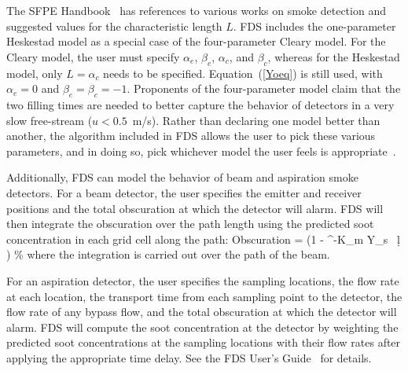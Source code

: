 The SFPE Handbook~\cite{SFPE} has references to various works on smoke detection and suggested values for the
characteristic length $L$. FDS includes the one-parameter Heskestad model as a special case of the four-parameter
Cleary model. For the Cleary model, the user must specify
$\alpha_e$, $\beta_e$, $\alpha_c$, and $\beta_c$, whereas for the Heskestad model, only $L=\alpha_c$ needs to be
specified. Equation~(\ref{Yoeq})
is still used, with $\alpha_e=0$ and $\beta_e=\beta_c=-1$.
Proponents of the four-parameter model claim that the two filling times are needed to
better capture the behavior of detectors in a very
slow free-stream ($u<0.5$~m/s). Rather than declaring one model better than another,
the algorithm included in FDS allows the
user to pick these various parameters, and in doing so, pick whichever model the user feels is appropriate~\cite{CSE_GCR}.

Additionally, FDS can model the behavior of beam and aspiration smoke detectors.  For a beam detector, the user
specifies the emitter and receiver positions and the total obscuration at which the detector will alarm.  FDS will then
integrate the obscuration over the path length using the predicted soot concentration in each grid cell along
the path:  
\be
  \hbox{Obscuration}  = \left(1 - ^{-K_m \int \rho Y_s \, \d l }  \right)   \; \; \hbox{\%}
\ee
where the integration is carried out over the path of the beam.

For an aspiration detector, the user specifies the sampling locations, the flow rate at each location, the
transport time from each sampling point to the detector, the flow rate of any bypass flow, and the total obscuration at which the
detector will alarm.  FDS will compute the soot concentration at the detector by weighting the predicted soot concentrations
at the sampling locations with their flow rates after applying the appropriate time delay. See the FDS User's Guide~\cite{FDS_Users_Guide} for details.

